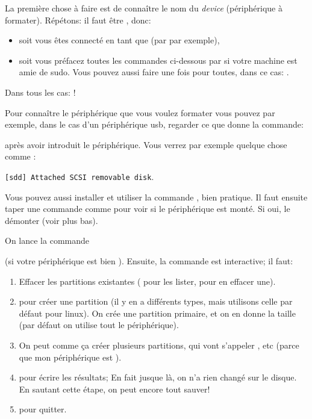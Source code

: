La première chose à faire est de connaître le nom du \emph{device}
(périphérique à formater). Répétons: il faut être , donc:
\begin{itemize}
\item soit vous êtes connecté en tant que   (par 
  par exemple),
\item soit vous préfacez toutes les commandes ci-dessous par 
  si votre machine est amie de sudo. Vous pouvez aussi faire une fois
  pour toutes, dans ce cas: .
\end{itemize}
Dans tous les cas: \textdbend!

Pour connaître le périphérique que vous voulez formater vous pouvez
par exemple, dans le cas d'un périphérique usb, regarder ce que donne
la commande: 


après avoir introduit le périphérique. Vous verrez par exemple quelque
chose comme :

\begin{center}
\texttt{[sdd] Attached SCSI removable disk}.
\end{center}


Vous pouvez aussi installer et utiliser la commande , bien
pratique.
Il faut ensuite taper une commande comme  pour voir si le
périphérique est monté. Si oui, le démonter (voir plus bas).

On lance la commande

 (si votre périphérique est bien
). Ensuite, la commande est interactive; 
il faut:
\begin{enumerate}
  \item Effacer les partitions existantes ( pour les lister,
     pour en effacer une).
  \item {} pour créer une partition (il y en a différents types,
    mais utilisons celle par défaut pour linux). On crée une partition primaire,
    et on en donne la taille (par défaut on utilise tout le périphérique).
   \item On peut comme ça créer plusieurs partitions, qui vont
     s'appeler ,  etc (parce que mon
     périphérique est ).
   \item {} pour écrire les résultats; En fait jusque là, on n'a
     rien changé sur le disque. En sautant cette étape, on peut encore
     tout sauver!
   \item {} pour quitter.
\end{enumerate}
